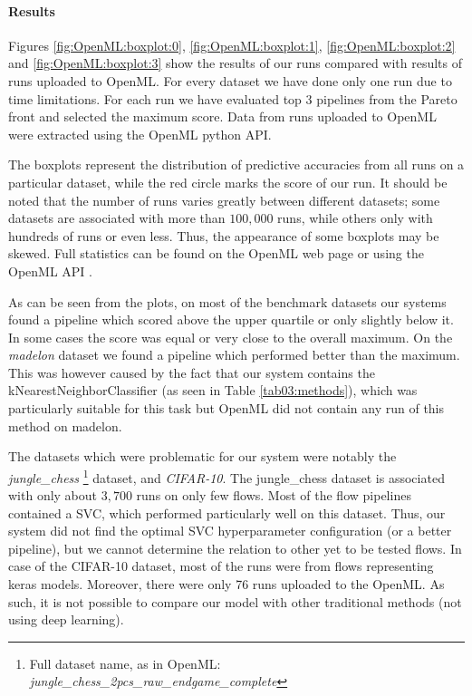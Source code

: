 \paragraph{Results}
Figures \ref{fig:OpenML:boxplot:0}, \ref{fig:OpenML:boxplot:1},
\ref{fig:OpenML:boxplot:2} and \ref{fig:OpenML:boxplot:3} show the results
of our runs compared with results of runs uploaded to OpenML. For every dataset
we have done only one run due to time limitations. For each run we have
evaluated top 3 pipelines from the Pareto front and selected the maximum score.
Data from runs uploaded to OpenML were extracted using the OpenML python API.

The boxplots represent the distribution of predictive accuracies from all runs
on a particular dataset, while the red circle marks the score of our run.
It should be noted that the number of runs varies
greatly between different datasets; some datasets are associated with more
than $100,000$ runs, while others only with hundreds of runs or even less. Thus,
the appearance of some boxplots may be skewed. Full statistics can be found on
the OpenML web page or using the OpenML API \citep{openmlcc18, openmlcc18docs}.

As can be seen from the plots, on most of the benchmark datasets our systems
found a pipeline which scored above the upper quartile or only slightly below
it. In some cases the score was equal or very close to the overall maximum. On
the \emph{madelon} dataset we found a pipeline which performed better than the
maximum. This was however caused by the fact that our system contains the
kNearestNeighborClassifier (as seen in Table \ref{tab03:methods}), which was
particularly suitable for this task but OpenML did not contain any run of this
method on madelon.

The datasets which were problematic for our system were notably the
\emph{jungle\_chess} \footnote{Full dataset name, as in OpenML:
\emph{jungle\_chess\_2pcs\_raw\_endgame\_complete}} dataset, 
and \emph{CIFAR-10}. The jungle\_chess dataset is associated with only
about $3,700$ runs on only few flows. Most of the flow pipelines contained a
SVC, which performed particularly well on this dataset. Thus, our system did
not find the optimal SVC hyperparameter configuration (or a better pipeline),
but we cannot determine the relation to other yet to be tested flows.
In case of the CIFAR-10 dataset, most of the runs were from flows representing
keras models. \citep{chollet2015keras} Moreover, there were only 76 runs
uploaded to the OpenML. As such, it is not possible to compare our model with
other traditional methods (not using deep learning).


